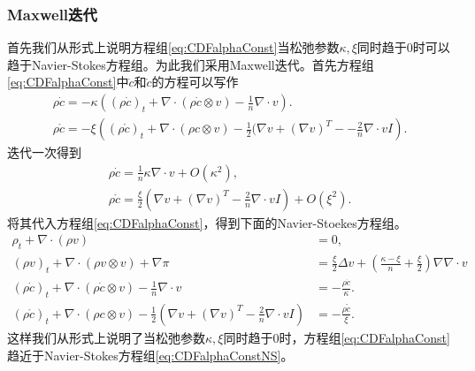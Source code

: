	\subsubsection{Maxwell迭代}
	首先我们从形式上说明方程组\eqref{eq:CDFalphaConst}当松弛参数$\kappa,\xi$同时趋于$0$时可以趋于Navier-Stokes方程组。为此我们采用Maxwell迭代。首先方程组\eqref{eq:CDFalphaConst}中$\dot{c}$和$\mathring{c}$的方程可以写作
	\begin{eqnarray*}
			\rho \dot{c} = - \kappa \left( (\rho \dot{c})_t  + \nabla \cdot(\rho \dot{c} \otimes v) - \frac{1}{n} \nabla \cdot v  \right). \\
			\rho \mathring{c} = -\xi \left( (\rho \mathring{c})_t + \nabla \cdot (\rho c \otimes v) - \frac{1}{2} (\nabla v + (\nabla v)^T - - \frac{2}{n} \nabla \cdot v I \right).
	\end{eqnarray*}
	迭代一次得到
	\begin{eqnarray*}
		\rho \dot{c} = \frac{1}{n} \kappa \nabla \cdot v + O(\kappa^2), \\
		\rho \mathring{c} =  \frac{\xi}{2}  (\nabla v + (\nabla v)^T - \frac{2}{n} \nabla \cdot v I) + O(\xi^2).
	\end{eqnarray*}
	将其代入方程组\eqref{eq:CDFalphaConst}，得到下面的Navier-Stoekes方程组。
	\begin{subequations}\label{eq:CDFalphaConstNS}
		\begin{align}
			\rho_t + \nabla \cdot (\rho v) &=0, \\
			(\rho v)_t + \nabla \cdot (\rho v \otimes v) + \nabla \pi &= \frac{\xi}{2} \Delta v + (\frac{\kappa - \xi}{n} + \frac{\xi}{2}) \nabla \nabla \cdot  v \\ %
			(\rho \dot{c})_t  + \nabla \cdot(\rho \dot{c} \otimes v) -  \frac{1}{n} \nabla \cdot v &= - \frac{\rho \dot{c}}{\kappa}. \\
			(\rho \mathring{c})_t + \nabla \cdot (\rho c \otimes v) - \frac{1}{2} (\nabla v + (\nabla v)^T - \frac{2}{n} \nabla \cdot v I) &= - \frac{\rho \mathring{c}}{\xi}.
		\end{align}
	\end{subequations}
	这样我们从形式上说明了当松弛参数$\kappa,\xi$同时趋于$0$时，方程组\eqref{eq:CDFalphaConst}趋近于Navier-Stokes方程组\eqref{eq:CDFalphaConstNS}。

